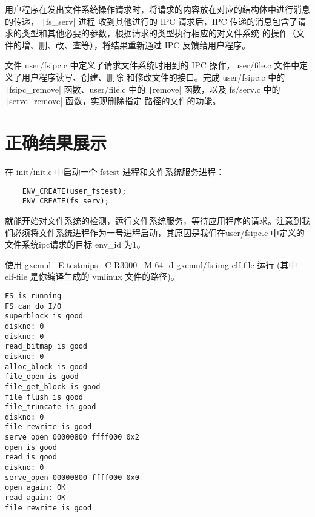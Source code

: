 用户程序在发出文件系统操作请求时，将请求的内容放在对应的结构体中进行消息的传递， \texttt|fs_serv| 进程
收到其他进行的 IPC 请求后，IPC 传递的消息包含了请求的类型和其他必要的参数，根据请求的类型执行相应的对文件系统
的操作（文件的增、删、改、查等），将结果重新通过 IPC 反馈给用户程序。

\begin{exercise}
文件 user/fsipc.c 中定义了请求文件系统时用到的 IPC 操作，user/file.c 文件中定义了用户程序读写、创建、删除
和修改文件的接口。完成 user/fsipc.c 中的 \texttt|fsipc_remove| 函数、user/file.c 中的
\texttt|remove| 函数，以及 fs/serv.c 中的 \texttt|serve_remove| 函数，实现删除指定
路径的文件的功能。
\end{exercise}

%
%

\section{正确结果展示}

在 init/init.c 中启动一个 fstest 进程和文件系统服务进程：

\begin{verbatim}
    ENV_CREATE(user_fstest);
    ENV_CREATE(fs_serv);
\end{verbatim}

就能开始对文件系统的检测，运行文件系统服务，等待应用程序的请求。注意到我们必须将文件系统进程作为一号进程启动，其原因是我们在user/fsipc.c 中定义的文件系统ipc请求的目标 env\_id 为1。

\begin{note}
使用 gxemul –E testmips –C R3000 –M 64 -d gxemul/fs.img elf-file 运行 (其中 elf-file 是你编译生成的 vmlinux 文件的路径)。 
\end{note}

\begin{verbatim}
FS is running
FS can do I/O
superblock is good
diskno: 0
diskno: 0
read_bitmap is good
diskno: 0
alloc_block is good
file_open is good
file_get_block is good
file_flush is good
file_truncate is good
diskno: 0
file rewrite is good
serve_open 00000800 ffff000 0x2
open is good
read is good
diskno: 0
serve_open 00000800 ffff000 0x0
open again: OK
read again: OK
file rewrite is good
\end{verbatim}

